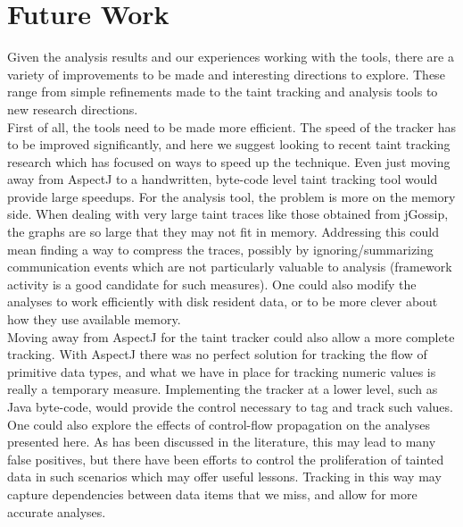 \documentclass[msc,oneside]{ubcthesis}
\begin{document}
\section{Future Work}

Given the analysis results and our experiences working with the tools, there are a variety of improvements to be made and interesting directions to explore. These range from simple refinements made to the taint tracking and analysis tools to new research directions.\\

First of all, the tools need to be made more efficient. The speed of the tracker has to be improved significantly, and here we suggest looking to recent taint tracking research which has focused on ways to speed up the technique. Even just moving away from AspectJ to a handwritten, byte-code level taint tracking tool would provide large speedups. For the analysis tool, the problem is more on the memory side. When dealing with very large taint traces like those obtained from jGossip, the graphs are so large that they may not fit in memory. Addressing this could mean finding a way to compress the traces, possibly by ignoring/summarizing communication events which are not particularly valuable to analysis (framework activity is a good candidate for such measures). One could also modify the analyses to work efficiently with disk resident data, or to be more clever about how they use available memory.\\

Moving away from AspectJ for the taint tracker could also allow a more complete tracking. With AspectJ there was no perfect solution for tracking the flow of primitive data types, and what we have in place for tracking numeric values is really a temporary measure. Implementing the tracker at a lower level, such as Java byte-code, would provide the control necessary to tag and track such values. One could also explore the effects of control-flow propagation on the analyses presented here. As has been discussed in the literature, this may lead to many false positives, but there have been efforts to control the proliferation of tainted data in such scenarios which may offer useful lessons. Tracking in this way may capture dependencies between data items that we miss, and allow for more accurate analyses.\\
\end{document}
